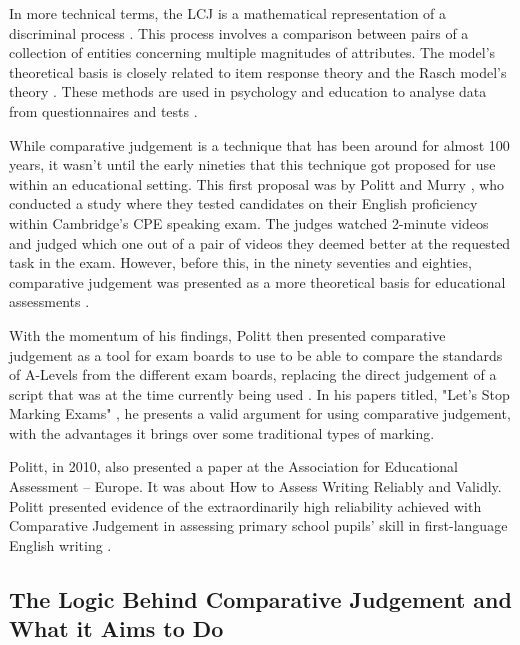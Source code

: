 		In more technical terms, the LCJ is a mathematical representation of a discriminal process \cite{thurstone1927psychophysical}. This process involves a comparison between pairs of a collection of entities concerning multiple magnitudes of attributes. The model's theoretical basis is closely related to item response theory \cite{embretson2013item} and the Rasch model's theory \cite{wright2000understanding}. These methods are used in psychology and education to analyse data from questionnaires and tests \cite{research_ed, furr2021psychometrics}.
		
		While comparative judgement is a technique that has been around for almost 100 years, it wasn't until the early nineties that this technique got proposed for use within an educational setting. This first proposal was by Politt and Murry \cite{pollitt1996raters}, who conducted a study where they tested candidates on their English proficiency within Cambridge's CPE speaking exam. The judges watched 2-minute videos and judged which one out of a pair of videos they deemed better at the requested task in the exam. However, before this, in the ninety seventies and eighties, comparative judgement was presented as a more theoretical basis for educational assessments \cite{andrich1978rating}. 
		
		With the momentum of his findings, Politt then presented comparative judgement as a tool for exam boards to use to be able to compare the standards of A-Levels from the different exam boards, replacing the direct judgement of a script that was at the time currently being used \cite{newton2007paired}. In his papers titled, "Let's Stop Marking Exams" \cite{stop_marking_pollitt}, he presents a valid argument for using comparative judgement, with the advantages it brings over some traditional types of marking.
		
		Politt, in 2010, also presented a paper at the Association for Educational Assessment – Europe. It was about How to Assess Writing Reliably and Validly. Politt presented evidence of the extraordinarily high reliability achieved with Comparative Judgement in assessing primary school pupils' skill in first-language English writing \cite{pollitt2009abolishing}.
		
	\subsection{The Logic Behind Comparative Judgement and What it Aims to Do} %
		
